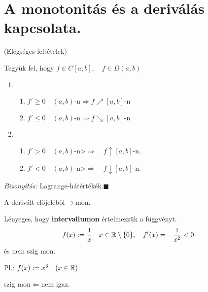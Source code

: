 \documentclass[a4paper,11.5pt]{article}
\begin{document}
	\section{A monotonitás és a deriválás kapcsolata.}
	\begin{theorem}
		(Elégséges feltételek)
		
		Tegyük fel, hogy $f\in C[a,b],\quad f\in D(a,b)$
		\begin{enumerate}
			\item \begin{enumerate}
				\item $f'\geq0\quad (a,b)$-n\quad $\Rightarrow f\nearrow[a,b]$-n
				\item $f'\leq0\quad (a,b)$-n\quad $\Rightarrow f\searrow[a,b]$-n
			\end{enumerate}
			\item \begin{enumerate}
				\item $f'>0\quad (a,b)$-n>\quad$ \Rightarrow\quad f\uparrow [a,b]$-n.
				\item $f'<0\quad (a,b)$-n>\quad$ \Rightarrow\quad f\downarrow [a,b]$-n.
			\end{enumerate}
		\end{enumerate}
		\textit{Bizonyítás:} Lagrange-hátértékék.\quad $\blacksquare$
	\end{theorem}
	\begin{note}
		A derivált előjeléből\quad $\longrightarrow$\quad mon.
	\end{note}
	\begin{note}
		Lényeges, hogy \textbf{intervallumon} értelmezzük a függvényt.
		\[ f(x):=\frac{1}{x}\quad x\in\mathbb{R}\setminus\{0\},\quad f'(x)=-\frac{1}{x^2}<0 \]
		és nem szig mon.
	\end{note}
	\begin{note}
		Pl.:
		  $f(x):=x^3\quad (x\in\mathbb{R})$
		  \begin{center}
		  	szig mon\quad $\Leftarrow$\quad nem igaz.
		  \end{center}
	\end{note}
\end{document}
